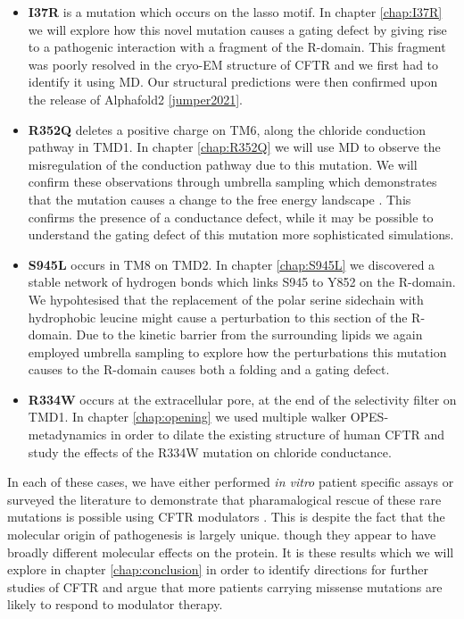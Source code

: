 \begin{itemize}
	\item \textbf{I37R} is a mutation which occurs on the lasso motif. In chapter \ref{chap:I37R} we will explore how this novel mutation causes a gating defect by giving rise to a pathogenic interaction with a fragment of the R-domain. This fragment was poorly resolved in the cryo-EM structure of CFTR and we first had to identify it using MD. Our structural predictions were then confirmed upon the release of Alphafold2 \ref{jumper2021}.
	\item \textbf{R352Q} deletes a positive charge on TM6, along the chloride conduction pathway in TMD1. In chapter \ref{chap:R352Q} we will use MD to observe the misregulation of the conduction pathway due to this mutation. We will confirm these observations through umbrella sampling which demonstrates that the mutation causes a change to the free energy landscape . This confirms the presence of a conductance defect, while it may be possible to understand the gating defect of this mutation more sophisticated simulations.
	\item \textbf{S945L} occurs in TM8 on TMD2. In chapter \ref{chap:S945L} we discovered a stable network of hydrogen bonds which links S945 to Y852 on the R-domain. We hypohtesised that the replacement of the polar serine sidechain with hydrophobic leucine might cause a perturbation to this section of the R-domain. Due to the kinetic barrier from the surrounding lipids we again employed umbrella sampling to explore how the perturbations this mutation causes to the R-domain causes both a folding and a gating defect.   
	\item \textbf {R334W} occurs at the extracellular pore, at the end of the selectivity filter on TMD1. In chapter \ref{chap:opening} we used multiple walker OPES-metadynamics in order to dilate the existing structure of human CFTR and study the effects of the R334W mutation on chloride conductance.
\end{itemize}
In each of these cases, we have either performed \textit{in vitro} patient specific assays or surveyed the literature to demonstrate that pharamalogical rescue of these rare mutations is possible using CFTR modulators \cite{R334W_Euro_CF_trial}. This is despite the fact that the molecular origin of pathogenesis is largely unique. though they appear to have broadly different molecular effects on the protein. It is these results which we will explore in chapter \ref{chap:conclusion} in order to identify directions for further studies of CFTR and argue that more patients carrying missense mutations are likely to respond to modulator therapy.

